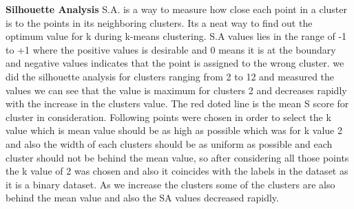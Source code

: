 \documentclass[a4paper,12pt]{article}
\begin{document}
\textbf{Silhouette Analysis} S.A. is a way to measure how close each point in a cluster is to the points in its neighboring clusters. Its a neat way to find out the optimum value for k during k-means clustering. S.A values lies in the range of -1 to +1 where the positive values is desirable and 0 means it is at the boundary and negative values indicates that the point is assigned to the wrong cluster. we did the silhouette analysis for clusters ranging from 2 to 12 and measured the values we can see that the value is maximum for clusters 2 and decreases rapidly with the increase in the clusters value.  The red doted line is the mean S score for cluster in consideration.  Following points were chosen in order to select the k value which is mean value should be as high as possible which was for k value 2 and also the width of each clusters should be as uniform as possible and each cluster should not be behind the mean value, so after considering all those points the k value of 2 was chosen and also it coincides with the labels in the dataset as it is a binary dataset.  As we increase the clusters some of the clusters are also behind the mean value and also the SA values decreased rapidly.\newline
\end{document}
